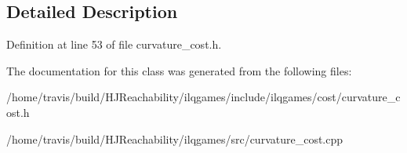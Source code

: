 \subsection{Detailed Description}


Definition at line 53 of file curvature\+\_\+cost.\+h.



The documentation for this class was generated from the following files\+:\begin{DoxyCompactItemize}
\item 
/home/travis/build/\+H\+J\+Reachability/ilqgames/include/ilqgames/cost/curvature\+\_\+cost.\+h\item 
/home/travis/build/\+H\+J\+Reachability/ilqgames/src/curvature\+\_\+cost.\+cpp\end{DoxyCompactItemize}
